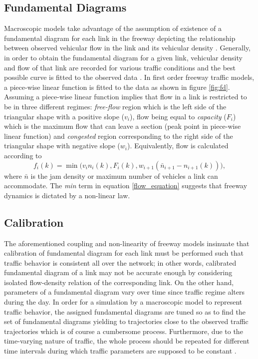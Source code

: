 \documentclass[twocolumn,10pt]{asme2e}
\begin{document}
\subsection{Fundamental Diagrams}
Macroscopic models take advantage of the assumption of existence of a fundamental diagram for each link in the freeway depicting the relationship between observed vehicular flow in the link and its vehicular density \cite{Calibration}. Generally, in order to obtain the fundamental diagram for a given link, vehicular density and flow of that link are recorded for various traffic conditions and the best possible curve is fitted to the observed data \cite{cassidy}. In first order freeway traffic models, a piece-wise linear function is fitted to the data as shown in figure \ref{fig:fd}. Assuming a piece-wise linear function implies that flow in a link is restricted to be in three different regimes: \textit{free-flow} region which is the left side of the triangular shape with a positive slope ($v_i$), flow being equal to \textit{capacity} ($F_i$) which is the maximum flow that can leave a section (peak point in piece-wise linear function) and \textit{congested} region corresponding to the right side of the triangular shape with negative slope ($w_i$). Equivalently, flow is calculated according to 
\begin{equation} \label{flow_equation}
f_i(k) = \min \big( v_in_i(k), F_i(k), w_{i+1}(\bar{n}_{i+1} - n_{i+1}(k))\big),
\end{equation}
 where $\bar{n}$ is the jam density or maximum number of vehicles a link can accommodate. The \textit{min} term in equation \ref{flow_equation} suggests that freeway dynamics is dictated by a non-linear law.

\subsection{Calibration}
The aforementioned coupling and non-linearity of freeway models insinuate that calibration of fundamental diagram for each link must be performed such that traffic behavior is consistent all over the network; in other words, calibrated fundamental diagram of a link may not be accurate enough by considering isolated flow-density relation of the corresponding link. On the other hand, parameters of a fundamental diagram vary over time since traffic regime alters during the day. In order for a simulation by a macroscopic model to represent traffic behavior, the assigned fundamental diagrams are tuned so as to find the set of fundamental diagrams yielding to trajectories close to the observed traffic trajectories which is of course a cumbersome process. Furthermore, due to the time-varying nature of traffic, the whole process should be repeated for different time intervals during which traffic parameters are supposed to be constant \cite{Calibration}. 
\end{document}
